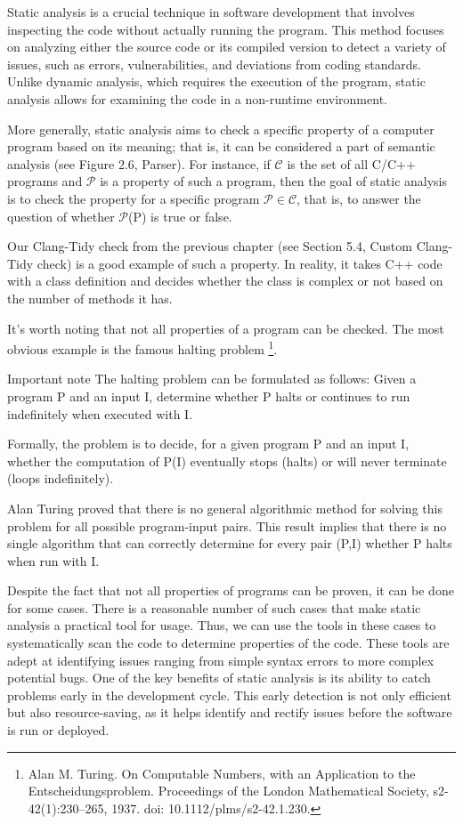 Static analysis is a crucial technique in software development that involves inspecting the code without actually running the program. This method focuses on analyzing either the source code or its compiled version to detect a variety of issues, such as errors, vulnerabilities, and deviations from coding standards. Unlike dynamic analysis, which requires the execution of the program, static analysis allows for examining the code in a non-runtime environment.

More generally, static analysis aims to check a specific property of a computer program based on its meaning; that is, it can be considered a part of semantic analysis (see Figure 2.6, Parser). For instance, if $\mathcal{C}$ is the set of all C/C++ programs and $\mathcal{P}$ is a property of such a program, then the goal of static analysis is to check the property for a specific program $\mathcal{P} \in \mathcal{C}$, that is, to answer the question of whether $\mathcal{P}$(P) is true or false.

Our Clang-Tidy check from the previous chapter (see Section 5.4, Custom Clang-Tidy check) is a good example of such a property. In reality, it takes C++ code with a class definition and decides whether the class is complex or not based on the number of methods it has.

It's worth noting that not all properties of a program can be checked. The most obvious example is the famous halting problem \footnote{Alan M. Turing. On Computable Numbers, with an Application to the Entscheidungsproblem. Proceedings of the London Mathematical Society, s2-42(1):230–265, 1937. doi: 10.1112/plms/s2-42.1.230.}.

\begin{myNotic}{Important note}
The halting problem can be formulated as follows: Given a program P and an input I, determine whether P halts or continues to run indefinitely when executed with I.
\end{myNotic}

Formally, the problem is to decide, for a given program P and an input I, whether the computation of P(I) eventually stops (halts) or will never terminate (loops indefinitely).

Alan Turing proved that there is no general algorithmic method for solving this problem for all possible program-input pairs. This result implies that there is no single algorithm that can correctly determine for every pair (P,I) whether P halts when run with I.

Despite the fact that not all properties of programs can be proven, it can be done for some cases. There is a reasonable number of such cases that make static analysis a practical tool for usage. Thus, we can use the tools in these cases to systematically scan the code to determine properties of the code. These tools are adept at identifying issues ranging from simple syntax errors to more complex potential bugs. One of the key benefits of static analysis is its ability to catch problems early in the development cycle. This early detection is not only efficient but also resource-saving, as it helps identify and rectify issues before the software is run or deployed.


